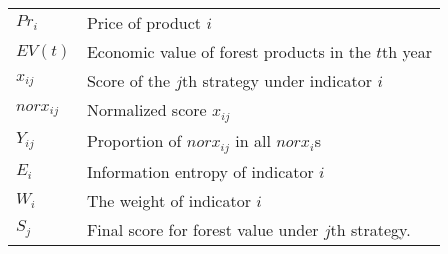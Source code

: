 \begin{table}[ht]
\begin{tabular}{ll}
\hline
    $Pr_i$      & Price of product $i$ \\
    $EV(t)$     & Economic value of forest products in the $t$th year \\
    $x_{ij}$    & Score of the $j$th strategy under indicator $i$ \\
    $norx_{ij}$ & Normalized score $x_{ij}$\\
    $Y_{ij}$    & Proportion of $norx_{ij}$ in all $norx_{i}$s \\
    $E_{i}$     & Information entropy of indicator $i$ \\
    $W_{i}$     & The weight of indicator $i$\\
    $S_{j}$     & Final score for forest value under $j$th strategy. \\
\hline
\end{tabular}
\end{table}

